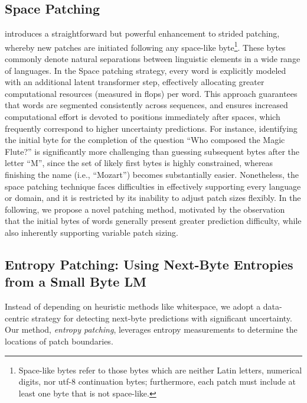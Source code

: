 \subsection{Space Patching}
\label{section:white-patch}

\citet{slagle2024spacebyte} introduces a straightforward but powerful enhancement to strided patching, whereby new patches are initiated following any space-like byte\footnote{
    Space-like bytes refer to those bytes which are neither Latin letters, numerical digits, nor utf-8 continuation bytes; furthermore, each patch must include at least one byte that is not space-like. }. These bytes commonly denote natural separations between linguistic elements in a wide range of languages. In the Space patching strategy, every word is explicitly modeled with an additional latent transformer step, effectively allocating greater computational resources (measured in flops) per word. This approach guarantees that words are segmented consistently across sequences, and ensures increased computational effort is devoted to positions immediately after spaces, which frequently correspond to higher uncertainty predictions. For instance, identifying the initial byte for the completion of the question ``Who composed the Magic Flute?\uline{\hspace{.6em}}'' is significantly more challenging than guessing subsequent bytes after the letter ``M'', since the set of likely first bytes is highly constrained, whereas finishing the name (i.e., ``Mozart'') becomes substantially easier. Nonetheless, the space patching technique faces difficulties in effectively supporting every language or domain, and it is restricted by its inability to adjust patch sizes flexibly. In the following, we propose a novel patching method, motivated by the observation that the initial bytes of words generally present greater prediction difficulty, while also inherently supporting variable patch sizing.

\subsection{Entropy Patching: Using Next-Byte Entropies from a Small Byte LM}
\label{section:dyn-patch}

Instead of depending on heuristic methods like whitespace, we adopt a data-centric strategy for detecting next-byte predictions with significant uncertainty. Our method, \textit{entropy patching}, leverages entropy measurements to determine the locations of patch boundaries.

